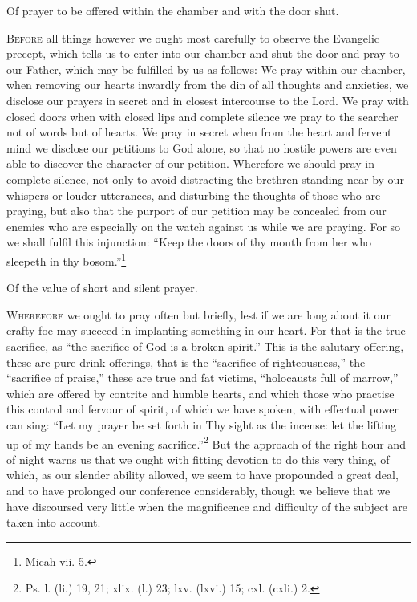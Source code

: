 
Of prayer to be offered within the chamber and with the door shut.

\textsc{Before} all things however we ought most carefully to observe the Evangelic precept, which tells us to enter into our chamber and shut the door and pray to our Father, which may be fulfilled by us as follows: We pray within our chamber, when removing our hearts inwardly from the din of all thoughts and anxieties, we disclose our prayers in secret and in closest intercourse to the Lord. We pray with closed doors when with closed lips and complete silence we pray to the searcher not of words but of hearts. We pray in secret when from the heart and fervent mind we disclose our petitions to God alone, so that no hostile powers are even able to discover the character of our petition. Wherefore we should pray in complete silence, not only to avoid distracting the brethren standing near by our whispers or louder utterances, and disturbing the thoughts of those who are praying, but also that the purport of our petition may be concealed from our enemies who are especially on the watch against us while we are praying. For so we shall fulfil this injunction: “Keep the doors of thy mouth from her who sleepeth in thy bosom.”\footnote{Micah vii. 5.}


Of the value of short and silent prayer.

\textsc{Wherefore} we ought to pray often but briefly, lest if we are long about it our crafty foe may succeed in implanting something in our heart. For that is the true sacrifice, as “the sacrifice of God is a broken spirit.” This is the salutary offering, these are pure drink offerings, that is the “sacrifice of righteousness,” the “sacrifice of praise,” these are true and fat victims, “holocausts full of marrow,” which are offered by contrite and humble hearts, and which those who practise this control and fervour of spirit, of which we have spoken, with effectual power can sing: “Let my prayer be set forth in Thy sight as the incense: let the lifting up of my hands be an evening sacrifice.”\footnote{Ps. l. (li.) 19, 21; xlix. (l.) 23; lxv. (lxvi.) 15; cxl. (cxli.) 2.} But the approach of the right hour and of night warns us that we ought with fitting devotion to do this very thing, of which, as our slender ability allowed, we seem to have propounded a great deal, and to have prolonged our conference considerably, though we believe that we have discoursed very little when the magnificence and difficulty of the subject are taken into account.

